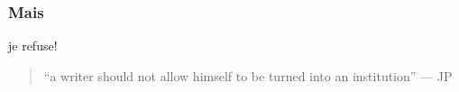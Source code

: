 \documentclass{beamer}
\begin{document}

\begin{frame}
\frametitle{Mais}
\begin{block}
{je refuse!} 


\begin{quote}
``a writer should not allow himself to be turned into an institution'' --- \textsc{JP}
\end{quote}


\end{block}
\end{frame}

%
%
\end{document}
